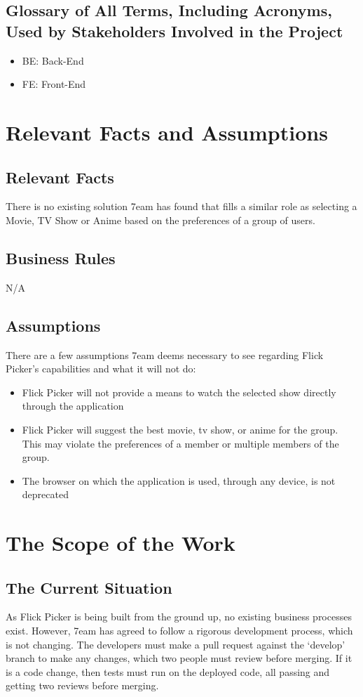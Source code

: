\documentclass[12pt]{article}
\begin{document}
\subsection{Glossary of All Terms, Including Acronyms, Used by Stakeholders Involved in the Project}
\begin{itemize}
	\item BE: Back-End
	\item FE: Front-End
\end{itemize}

\section{Relevant Facts and Assumptions}

\subsection{Relevant Facts}
There is no existing solution 7eam has found that fills a similar role as selecting a Movie, TV Show or Anime based on the preferences of a group of users.


\subsection{Business Rules}
N/A

\subsection{Assumptions}
There are a few assumptions 7eam deems necessary to see regarding Flick Picker's capabilities and what it will not do:
\begin{itemize}
	\item Flick Picker will not provide a means to watch the selected show directly through the application
	\item Flick Picker will suggest the best movie, tv show, or anime for the group. This may violate the preferences of a member or multiple members of the group.
	\item The browser on which the application is used, through any device, is not deprecated
\end{itemize}

\section{The Scope of the Work}

\subsection{The Current Situation}
As Flick Picker is being built from the ground up, no existing business processes exist. However, 7eam has agreed to follow a rigorous development process, which is not changing. The developers must make a pull request against the `develop' branch to make any changes, which two people must review before merging. If it is a code change, then tests must run on the deployed code, all passing and getting two reviews before merging.
\end{document}
